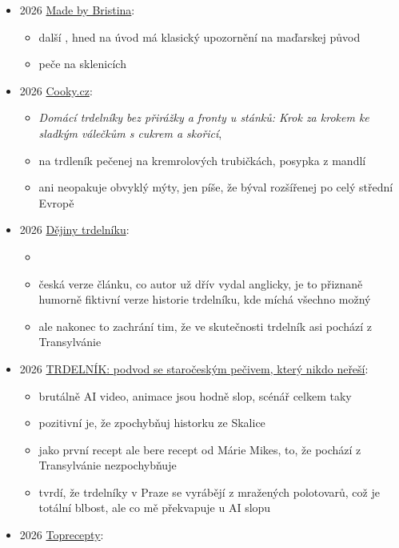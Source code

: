 \begin{itemize}
  \begin{itemize}
  \tightlist
  \item
     na Youtube
  \end{itemize}
\item
  2026 \href{https://www.madebykristina.cz/recepty/trdelnik/}{Made by
  Bristina}:

  \begin{itemize}
  \tightlist
  \item
    další  , hned na úvod má klasický upozornění na
    maďarskej původ
  \item
    peče na sklenicích
  \end{itemize}
\item
  2026
  \href{https://cooky.cz/domaci-trdelniky-bez-prirazky-a-fronty-u-stanku-krok-za-krokem-ke-sladkym-valeckum-s-cukrem-a-skorici/}{Cooky.cz}:

  \begin{itemize}
  \tightlist
  \item
    \emph{Domácí trdelníky bez přirážky a fronty u stánků: Krok za
    krokem ke sladkým válečkům s cukrem a skořicí},
  \item
     na trdleník pečenej na kremrolových trubičkách,
    posypka z mandlí
  \item
    ani neopakuje obvyklý mýty, jen píše, že býval rozšířenej po celý
    střední Evropě
  \end{itemize}
\item
  2026 \href{https://markbakerprague.com/dejiny-trdelniku/}{Dějiny
  trdelníku}:

  \begin{itemize}
  \tightlist
  \item
  \item
    česká verze článku, co autor už dřív vydal anglicky, je to přiznaně
    humorně fiktivní verze historie trdelníku, kde míchá všechno možný
  \item
    ale nakonec to zachrání tim, že ve skutečnosti trdelník asi pochází
    z Transylvánie
  \end{itemize}
\item
  2026 \href{https://www.youtube.com/watch?v=HGSL-n-mi0g}{TRDELNÍK:
  podvod se staročeským pečivem, který nikdo neřeší}:

  \begin{itemize}
  \tightlist
  \item
    brutálně AI video, animace jsou hodně slop, scénář celkem taky
  \item
    pozitivní je, že zpochybňuj historku ze Skalice
  \item
    jako první recept ale bere recept od Márie Mikes, to, že pochází z
    Transylvánie nezpochybňuje
  \item
    tvrdí, že trdelníky v Praze se vyrábějí z mražených polotovarů, což
    je totální blbost, ale co mě překvapuje u AI slopu
  \end{itemize}
\item
  2026
  \href{https://www.toprecepty.cz/tipy-triky/trdelniky-jak-udelat-sladke-valce-se-skorici-a-orechy/}{Toprecepty}:


\end{itemize}
